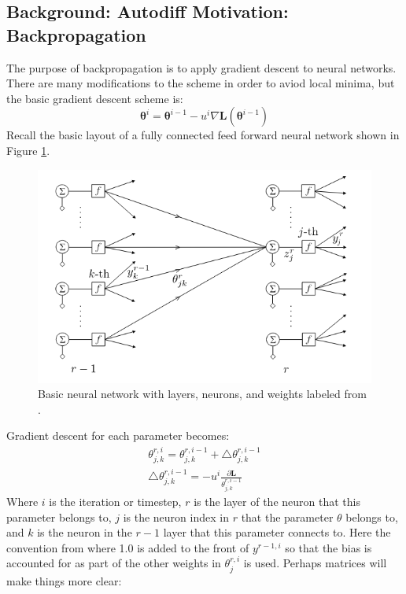 \documentclass[]{article}
\begin{document}
\subsection{Background: Autodiff Motivation: Backpropagation}
The purpose of backpropagation is to apply gradient descent to neural networks.  There are many modifications to the scheme in order to aviod local minima, but the basic gradient descent scheme is:
\begin{equation}
\boldsymbol{\theta}^i = \boldsymbol{\theta}^{i-1} - u^i\nabla \textbf{L}(\boldsymbol{\theta}^{i-1})
\end{equation}
Recall the basic layout of a fully connected feed forward neural network shown in Figure \ref{fig:nnfrommlbook}.  
\begin{figure}
	\centering
	\includegraphics[width=1\linewidth]{images/nn_from_ml_book}
	\caption[ANN Labeled]{Basic neural network with layers, neurons, and weights labeled from \cite{ml_book}.}
	\label{fig:nnfrommlbook}
\end{figure}
Gradient descent for each parameter becomes:
\begin{gather}
\theta^{r,i}_{j,k} = \theta^{r,i-1}_{j,k} + \triangle\theta^{r, i -1}_{j,k} \\
\triangle\theta^{r, i -1}_{j,k} = - u^i\frac{\partial \textbf{L}}{ \theta^{r,i-1}_{j,k}}
\end{gather}
Where $i$ is the iteration or timestep, $r$ is the layer of the neuron that this parameter belongs to, $j$ is the neuron index in $r$ that the parameter $\theta$ belongs to, and $k$ is the neuron in the $r-1$ layer that this parameter connects to.  Here the convention from \cite{ml_book} where 1.0 is added to the front of $y^{r-1, i}$ so that the bias is accounted for as part of the other weights in $\theta^{r, i}_j$ is used.  Perhaps matrices will make things more clear:
\end{document}
